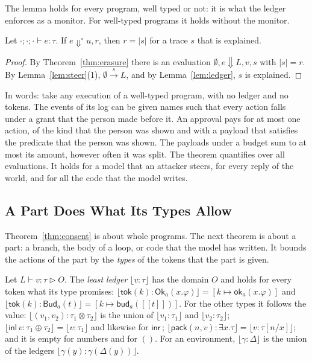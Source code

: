 \documentclass[acmsmall,nonacm,screen]{acmart}
\newcommand{\kw}[1]{\mathsf{#1}}
\newcommand{\Ok}[2]{\kw{Ok}_{#1}(#2)}
\newcommand{\Bud}[2]{\kw{Bud}_{#1}(#2)}
\newcommand{\ok}[2]{\kw{ok}_{#1}(#2)}
\newcommand{\bud}[2]{\kw{bud}_{#1}(#2)}
\newcommand{\pack}[2]{\kw{pack}(#1, #2)}
\newcommand{\inl}{\kw{inl}\,}
\newcommand{\inr}{\kw{inr}\,}
\newcommand{\tok}[1]{\kw{tok}(#1)}
\newcommand{\sem}[1]{[\![#1]\!]}
\newcommand{\evto}{\Downarrow}
\newcommand{\lstep}[1]{\xrightarrow{\,#1\,}}
\newcommand{\own}{\mathrel{\triangleright}}
\newcommand{\er}[1]{|#1|}
\newcommand{\least}[2]{\lfloor #1 : #2 \rfloor}
\begin{document}
The lemma holds for every program, well typed or not: it is what the ledger enforces as a
monitor. For well-typed programs it holds without the monitor.

\begin{theorem}[Consent]
\label{thm:consent}
Let $\cdot; \cdot; \cdot \vdash e : \tau$. If $e \evto^{\circ} u, r$, then $r = \er{s}$ for a
trace $s$ that is explained.
\end{theorem}

\begin{proof}
By Theorem~\ref{thm:erasure} there is an evaluation $\emptyset, e \evto L, v, s$ with
$\er{s} = r$. By Lemma~\ref{lem:steer}(1), $\emptyset \lstep{s} L$, and by
Lemma~\ref{lem:ledger}, $s$ is explained.
\end{proof}

In words: take any execution of a well-typed program, with no ledger and no tokens. The events
of its log can be given names such that every action falls under a grant that the person made
before it. An approval pays for at most one action, of the kind that the person was shown and
with a payload that satisfies the predicate that the person was shown. The payloads under a
budget sum to at most its amount, however often it was split. The theorem quantifies over all
evaluations. It holds for a model that an attacker steers, for every reply of the world, and
for all the code that the model writes.

\subsection{A Part Does What Its Types Allow}

Theorem~\ref{thm:consent} is about whole programs. The next theorem is about a part: a branch,
the body of a loop, or code that the model has written. It bounds the actions of the part by
the \emph{types} of the tokens that the part is given.

\begin{definition}
\label{def:least}
Let $L \vdash v : \tau \own O$. The \emph{least ledger} $\least{v}{\tau}$ has the domain $O$
and holds for every token what its type promises:
$\least{\tok{k}}{\Ok{a}{x.\varphi}} = [k \mapsto \ok{a}{x.\varphi}]$ and
$\least{\tok{k}}{\Bud{a}{t}} = [k \mapsto \bud{a}{\sem{t}}]$. For the other types it follows
the value: $\least{(v_1, v_2)}{\tau_1 \otimes \tau_2}$ is the union of $\least{v_1}{\tau_1}$
and $\least{v_2}{\tau_2}$; $\least{\inl v}{\tau_1 \oplus \tau_2} = \least{v}{\tau_1}$ and
likewise for $\inr$; $\least{\pack{n}{v}}{\exists x.\tau} = \least{v}{\tau[n/x]}$; and it is
empty for numbers and for $()$. For an environment, $\least{\gamma}{\Delta}$ is the union of
the ledgers $\least{\gamma(y)}{\gamma(\Delta(y))}$.
\end{definition}
\end{document}

